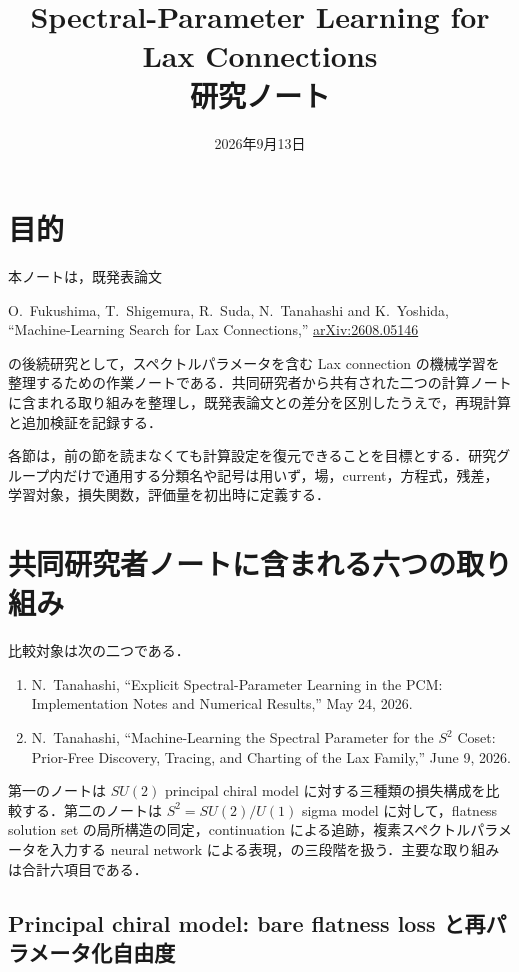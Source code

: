\documentclass[11pt,a4paper]{ltjsarticle}
\title{Spectral-Parameter Learning for Lax Connections\\研究ノート}
\author{}
\date{2026年9月13日}
\begin{document}
\maketitle

\section{目的}

本ノートは，既発表論文
\begin{center}
O.~Fukushima, T.~Shigemura, R.~Suda, N.~Tanahashi and K.~Yoshida,
``Machine-Learning Search for Lax Connections,''
\href{https://arxiv.org/abs/2608.05146}{arXiv:2608.05146}
\end{center}
の後続研究として，スペクトルパラメータを含む Lax connection の機械学習を整理するための作業ノートである．共同研究者から共有された二つの計算ノートに含まれる取り組みを整理し，既発表論文との差分を区別したうえで，再現計算と追加検証を記録する．

各節は，前の節を読まなくても計算設定を復元できることを目標とする．研究グループ内だけで通用する分類名や記号は用いず，場，current，方程式，残差，学習対象，損失関数，評価量を初出時に定義する．

\section{共同研究者ノートに含まれる六つの取り組み}

比較対象は次の二つである．
\begin{enumerate}
  \item N.~Tanahashi, ``Explicit Spectral-Parameter Learning in the PCM: Implementation Notes and Numerical Results,'' May 24, 2026.
  \item N.~Tanahashi, ``Machine-Learning the Spectral Parameter for the $S^2$ Coset: Prior-Free Discovery, Tracing, and Charting of the Lax Family,'' June 9, 2026.
\end{enumerate}

第一のノートは $SU(2)$ principal chiral model に対する三種類の損失構成を比較する．第二のノートは $S^2=SU(2)/U(1)$ sigma model に対して，flatness solution set の局所構造の同定，continuation による追跡，複素スペクトルパラメータを入力する neural network による表現，の三段階を扱う．主要な取り組みは合計六項目である．

\subsection{Principal chiral model: bare flatness loss と再パラメータ化自由度}
\end{document}
